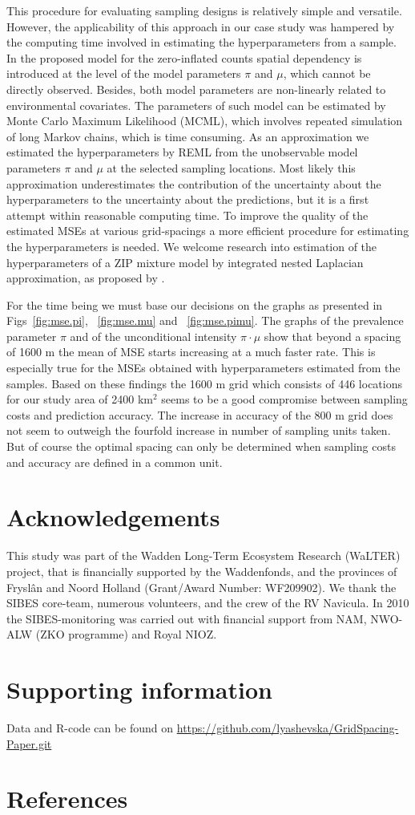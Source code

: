 \documentclass[review]{elsarticle}
\begin{document}
This procedure for evaluating sampling designs is relatively simple and versatile. However, the applicability of this approach in our case study was hampered by the computing time involved in estimating the hyperparameters from a sample. In the proposed model for the zero-inflated counts spatial dependency is introduced at the level of the model parameters $\pi$ and $\mu$, which cannot be directly observed. Besides, both model parameters are non-linearly related to environmental covariates. The parameters of such model can be estimated by Monte Carlo Maximum Likelihood (MCML), which involves repeated simulation of long Markov chains, which is time consuming. As an approximation we estimated the hyperparameters by REML from the unobservable model parameters $\pi$ and $\mu$ at the selected sampling locations. Most likely this approximation underestimates the contribution of the uncertainty about the hyperparameters to the uncertainty about the predictions, but it is a first attempt within reasonable computing time. To improve the quality of the estimated MSEs at various grid-spacings a more efficient procedure for estimating the hyperparameters is needed. We welcome research into estimation of the hyperparameters of a ZIP mixture model by integrated nested Laplacian approximation, as proposed by \citet{rue2009}.

For the time being we must base our decisions on the graphs as presented in Figs~\ref{fig:mse.pi}, ~\ref{fig:mse.mu} and ~\ref{fig:mse.pimu}. The graphs of the prevalence parameter $\pi$ and of the unconditional intensity $\pi \cdot \mu$ show that beyond a spacing of 1600 m the mean of MSE starts increasing at a much faster rate. This is especially true for the MSEs obtained with hyperparameters estimated from the samples. Based on these findings the 1600 m grid which consists of 446 locations for our study area of 2400 km$^{2}$ seems to be a good compromise between sampling costs and prediction accuracy. The increase in accuracy of the 800 m grid does not seem to outweigh the fourfold increase in number of sampling units taken. But of course the optimal spacing can only be determined when sampling costs and accuracy are defined in a common unit.

\section*{Acknowledgements}

This study was part of the Wadden Long-Term Ecosystem Research (WaLTER) project, that is financially supported by the Waddenfonds, and the provinces of Frysl\^{a}n and Noord Holland (Grant/Award Number: WF209902). We thank the SIBES core-team, numerous volunteers, and the crew of the RV Navicula.
In 2010 the SIBES-monitoring was carried out with financial support from NAM, NWO-ALW (ZKO programme) and Royal NIOZ.

\section*{Supporting information}
Data and R-code can be found on \url{https://github.com/lyashevska/GridSpacing-Paper.git}

\section*{References}

\end{document}
